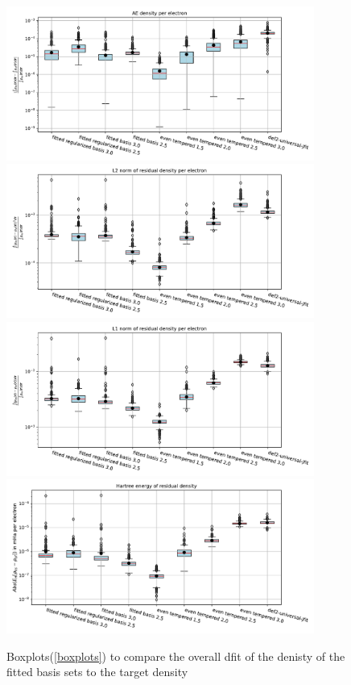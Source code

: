 \begin{figure}
    \centering
        \includegraphics[width=0.9\textwidth]{chapters/results/results_images/AE_density_on_hartree+external_MOFDFT_for_different_basis_sets}
    \includegraphics[width=0.9\textwidth]{chapters/results/results_images/L2_residual_densities_on_hartree+external_MOFDFT_for_different_basis_sets}
    \includegraphics[width=0.9\textwidth]{chapters/results/results_images/L1_residual_densities_on_hartree+external_MOFDFT_for_different_basis_sets}
    \includegraphics[width=0.9\textwidth]{chapters/results/results_images/L2_residual_hartree_on_hartree+external_MOFDFT_for_different_basis_sets}
\caption{Boxplots(\ref{boxplots}) to compare the overall dfit of the denisty of the fitted basis sets to the target density}
\end{figure}
